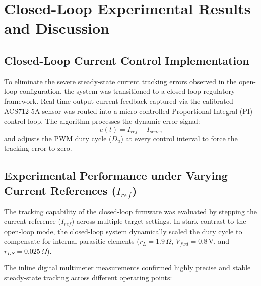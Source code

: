 \documentclass[12pt,a4paper]{article}
\begin{document}
\section{Closed-Loop Experimental Results and Discussion}

\subsection{Closed-Loop Current Control Implementation}
To eliminate the severe steady-state current tracking errors observed in the open-loop configuration, the system was transitioned to a closed-loop regulatory framework. Real-time output current feedback captured via the calibrated ACS712-5A sensor was routed into a micro-controlled Proportional-Integral (PI) control loop. The algorithm processes the dynamic error signal:
\begin{equation}
e(t) = I_{ref} - I_{sense}
\end{equation}
and adjusts the PWM duty cycle ($D_u$) at every control interval to force the tracking error to zero. 

\subsection{Experimental Performance under Varying Current References ($I_{ref}$)}
The tracking capability of the closed-loop firmware was evaluated by stepping the current reference ($I_{ref}$) across multiple target settings. In stark contrast to the open-loop mode, the closed-loop system dynamically scaled the duty cycle to compensate for internal parasitic elements ($r_L = 1.9\,\Omega$, $V_{fwd} = 0.8\,\text{V}$, and $r_{DS} = 0.025\,\Omega$).

The inline digital multimeter measurements confirmed highly precise and stable steady-state tracking across different operating points:
\end{document}
